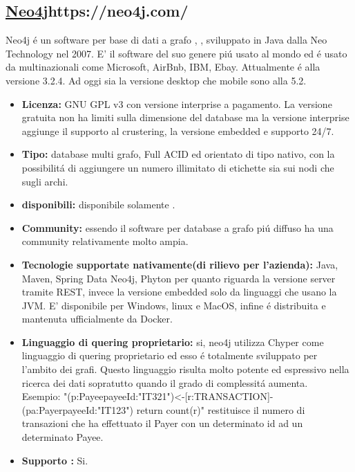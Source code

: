 \subsection{\url{Neo4j}{https://neo4j.com/}}
Neo4j \'e un software per base di dati a grafo , , sviluppato in Java dalla Neo Technology  nel 2007.
E' il software del suo genere pi\'u usato al mondo ed \'e usato da multinazionali come Microsoft, AirBnb, IBM, Ebay.
Attualmente \'e alla versione 3.2.4.
Ad oggi sia la versione desktop che mobile sono alla 5.2.
\begin{itemize}
\item \textbf{Licenza:} GNU GPL v3 con versione interprise a pagamento. La versione gratuita non ha limiti sulla dimensione del database ma la versione interprise aggiunge il supporto al crustering, la versione embedded e supporto 24/7.
\item \textbf{Tipo:} database multi grafo, Full ACID ed orientato di tipo nativo, con la possibilit\'a di aggiungere un numero illimitato di etichette sia sui nodi che sugli archi.
\item \textbf{ disponibili:} disponibile solamente .
\item \textbf{Community:} essendo il software per database a grafo pi\'u diffuso ha una community relativamente molto ampia.	
\item \textbf{Tecnologie supportate nativamente(di rilievo per l'azienda):} Java, Maven, Spring Data Neo4j, Phyton per quanto riguarda la versione server tramite REST, invece la versione embedded solo da linguaggi che usano la JVM. E' disponibile per Windows, linux e MacOS, infine \'e distribuita e mantenuta ufficialmente da Docker.
\item\textbf{Linguaggio di quering proprietario:} si, neo4j utilizza Chyper come linguaggio di quering proprietario ed esso \'e totalmente sviluppato per l'ambito dei grafi. Questo linguaggio risulta molto potente ed espressivo nella ricerca dei dati sopratutto quando il grado di complessit\'a aumenta.\\
Esempio: "(p:Payee{payeeId:"IT321"})<-[r:TRANSACTION]-(pa:Payer{payeeId:"IT123"}) return count(r)" restituisce il numero di transazioni che ha effettuato il Payer con un determinato id ad un determinato Payee.
\item\textbf{Supporto :} Si.


\end{itemize}

